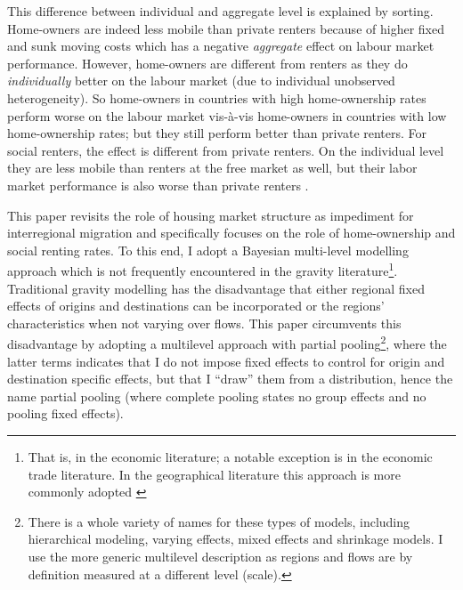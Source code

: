 \documentclass[fleqn,10pt]{SelfArx} %
\begin{document}
        This difference between individual and aggregate level is explained by
        sorting. Home-owners are indeed less mobile than private renters because
        of higher fixed and sunk moving costs which has a negative
        \emph{aggregate} effect on labour market performance. However,
        home-owners are different from renters as they do \emph{individually}
        better on the labour market (due to individual unobserved
        heterogeneity). So home-owners in countries with high home-ownership
        rates perform worse on the labour market vis-\`a-vis home-owners in
        countries with low home-ownership rates; but they still perform better
        than private renters. For social renters, the effect is different from
        private renters. On the individual level they are less mobile than
        renters at the free market as well, but their labor market performance
        is also worse than private renters \citep{hughes1981council,
          de2009homeownership}.
        
        This paper revisits the role of housing market structure as impediment
        for interregional migration and specifically focuses on the role of
        home-ownership and social renting rates. To this end, I adopt a Bayesian
        multi-level modelling approach which is not frequently encountered in
        the gravity literature\footnote{That is, in the economic literature; a
          notable exception is \citet{ranjan2007bayesian} in the economic trade
          literature. In the geographical literature this approach is more
          commonly adopted \citep[see within a migration
          context][]{congdon2010random, congdon2012spatial}}. Traditional
        gravity modelling has the disadvantage that either regional fixed
        effects of origins and destinations can be incorporated or the regions'
        characteristics when not varying over flows. This paper circumvents this
        disadvantage by adopting a multilevel approach with partial
        pooling\footnote{There is a whole variety of names for these types of
          models, including hierarchical modeling, varying effects, mixed
          effects and shrinkage models. I use the more generic multilevel
          description as regions and flows are by definition measured at a
          different level (scale).}, where the latter terms indicates that I do
        not impose fixed effects to control for origin and destination specific
        effects, but that I ``draw'' them from a distribution, hence the name
        partial pooling (where complete pooling states no group effects and no
        pooling fixed effects).
               
\end{document}

